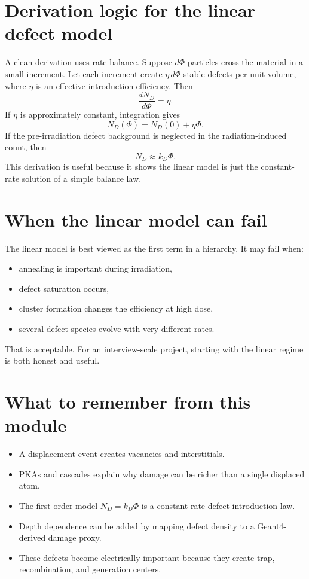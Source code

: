 \documentclass[11pt]{article}
\begin{document}
\section{Derivation logic for the linear defect model}
A clean derivation uses rate balance. Suppose $d\Phi$ particles cross the material in a small increment. Let each increment create $\eta\, d\Phi$ stable defects per unit volume, where $\eta$ is an effective introduction efficiency. Then
\begin{equation}
\frac{dN_D}{d\Phi} = \eta.
\end{equation}
If $\eta$ is approximately constant, integration gives
\begin{equation}
N_D(\Phi) = N_D(0) + \eta \Phi.
\end{equation}
If the pre-irradiation defect background is neglected in the radiation-induced count, then
\begin{equation}
N_D \approx k_D \Phi.
\end{equation}
This derivation is useful because it shows the linear model is just the constant-rate solution of a simple balance law.

\section{When the linear model can fail}
The linear model is best viewed as the first term in a hierarchy. It may fail when:
\begin{itemize}
    \item annealing is important during irradiation,
    \item defect saturation occurs,
    \item cluster formation changes the efficiency at high dose,
    \item several defect species evolve with very different rates.
\end{itemize}

That is acceptable. For an interview-scale project, starting with the linear regime is both honest and useful.

\section{What to remember from this module}
\begin{itemize}
    \item A displacement event creates vacancies and interstitials.
    \item PKAs and cascades explain why damage can be richer than a single displaced atom.
    \item The first-order model $N_D = k_D \Phi$ is a constant-rate defect introduction law.
    \item Depth dependence can be added by mapping defect density to a Geant4-derived damage proxy.
    \item These defects become electrically important because they create trap, recombination, and generation centers.
\end{itemize}
\end{document}
